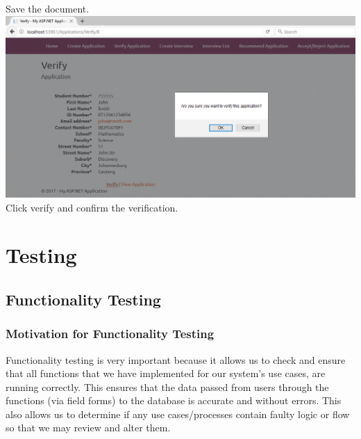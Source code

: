 \documentclass{article}
\begin{document}
\begin{center}
Save the document.\\ \bigskip
\includegraphics[scale=0.5]{VerifyApplication4.png}\\
Click verify and confirm the verification.\\ \bigskip
\end{center}
\section{Testing}
\subsection{Functionality Testing}
\subsubsection{Motivation for Functionality Testing} 
Functionality testing is very important because it allows us to check and ensure that all functions that we have implemented for our system’s use
cases, are running correctly. This ensures that the data passed from users through the functions (via field forms) to the database is accurate and
without errors. This also allows us to determine if any use cases/processes contain faulty logic or flow so that we may review and alter them. 
\end{document}
